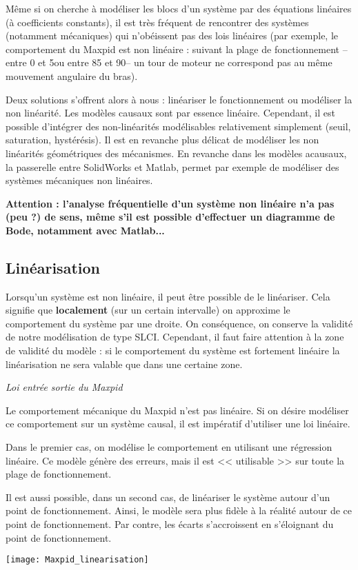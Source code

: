 Même si on cherche à modéliser les blocs d'un système par des équations linéaires (à coefficients constants), il est très fréquent de rencontrer des systèmes (notamment mécaniques) qui n'obéissent pas des lois linéaires (par exemple, le comportement du Maxpid est non linéaire : suivant la plage de fonctionnement -- entre 0 et 5\textdegree ou entre 85 et 90\textdegree -- un tour de moteur ne correspond pas au même mouvement angulaire du bras). 

Deux solutions s'offrent alors à nous : linéariser le fonctionnement ou modéliser la non linéarité. 
Les modèles causaux sont par essence linéaire. Cependant, il est possible d'intégrer des non-linéarités modélisables relativement simplement (seuil, saturation, hystérésis). Il est en revanche plus délicat de modéliser les non linéarités géométriques des mécanismes. 
En revanche dans les modèles acausaux, la passerelle entre SolidWorks et Matlab, permet par exemple de modéliser des systèmes mécaniques non linéaires.

\textbf{Attention : l'analyse fréquentielle d'un système non linéaire n'a pas (peu ?) de sens, même s'il est possible d'effectuer un diagramme de Bode, notamment avec Matlab...}

\subsection{Linéarisation}
Lorsqu'un système est non linéaire, il peut être possible de le linéariser. Cela signifie que \textbf{localement} (sur un certain intervalle) on approxime le comportement du système par une droite. On conséquence, on conserve la validité de notre modélisation de type SLCI. Cependant, il faut faire attention à la zone de validité du modèle : si le comportement du système est fortement linéaire la linéarisation ne sera valable que dans une certaine zone.

\begin{exemple}
\textit{Loi entrée sortie du Maxpid}

Le comportement mécanique du Maxpid n'est pas linéaire. Si on désire modéliser ce comportement sur un système causal, il est impératif d'utiliser une loi linéaire. 

Dans le premier cas, on modélise le comportement en utilisant une régression linéaire. 
Ce modèle génère des erreurs, mais il est << utilisable >> sur toute la plage de fonctionnement. 

Il est aussi possible, dans un second cas, de linéariser le système autour d'un point de fonctionnement. Ainsi, le modèle sera plus fidèle à la réalité autour de ce point de fonctionnement. Par contre, les écarts s'accroissent en s'éloignant du point de fonctionnement. 

\begin{center}
\texttt{[image: Maxpid\_linearisation]}
\end{center}


\end{exemple}


